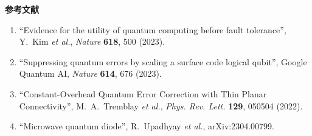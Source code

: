 \documentclass[11pt,a4j,dvipdfmx]{jarticle} 					%
\newcommand{\研究課題名}{誤り耐性量子コンピュータに向けた誤り訂正技術の開発(仮)}
\newcommand{\研究機関名}{東京大学}
\newcommand{\研究代表者氏名}{寺師弘二}
\newcommand{\me}{\underline{\underline{K.~Terashi}}}
\newcommand{\研究期間の最終元号年度}{10}  %
\begin{document}
\vspace*{0.5zw}
\noindent\textbf{参考文献} \vspace{-2mm}
\begin{enumerate}
	\renewcommand{\labelenumi}{[\arabic{enumi}]}
	\item \label{IBM_Utility} ``Evidence for the utility of quantum computing before fault tolerance'',
		Y.~Kim {\it et al.}, {\it Nature} {\bf 618}, 500 (2023).\vspace{-3mm}
	\item \label{Google} ``Suppressing quantum errors by scaling a surface code logical qubit'', 
		Google Quantum AI, {\it Nature} {\bf 614}, 676 (2023).\vspace{-3mm}
	\item \label{LDPC2} ``Constant-Overhead Quantum Error Correction with Thin Planar Connectivity'', 
		M.~A.~Tremblay {\it et al.}, {\it Phys. Rev. Lett.} {\bf 129}, 050504 (2022).\vspace{-3mm}
        \item \label{JJ_reciprocle} ``Microwave quantum diode'',
                R.~Upadhyay {\it et al.}, arXiv:2304.00799.\vspace{-3mm}
		
\end{enumerate}



\end{document}
